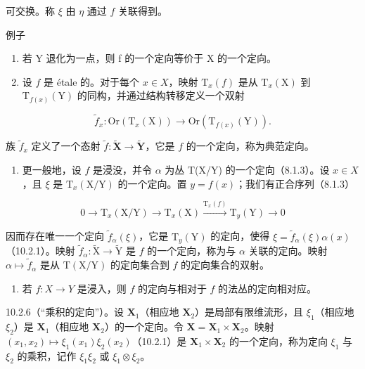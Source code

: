 可交换。称 \(\xi\) 由 \(\eta\) 通过 \(f\) 关联得到。

例子

\begin{enumerate}
\def\labelenumi{\alph{enumi})}
\item
  若 Y 退化为一点，则 f 的一个定向等价于 X 的一个定向。
\item
  设 \(f\) 是 étale 的。对于每个 \(x \in X\)，映射 \(\mathrm{T}_{x}(f)\) 是从 \(\mathrm{T}_{x}(\mathrm{X})\) 到 \(\mathrm{T}_{f(x)}(\mathrm{Y})\) 的同构，并通过结构转移定义一个双射
\end{enumerate}

\[
\tilde {f} _ {x}: \mathrm{Or} (\mathrm{T} _ {x} (\mathrm{X})) \rightarrow \mathrm{Or} (\mathrm{T} _ {f (x)} (\mathrm{Y})).
\]

族 \(\tilde{f}_{x}\) 定义了一个态射 \(\tilde{f}\colon\tilde{\mathbf{X}}\to\tilde{\mathbf{Y}}\)，它是 \(f\) 的一个定向，称为典范定向。

\begin{enumerate}
\def\labelenumi{\alph{enumi})}
\setcounter{enumi}{2}
\tightlist
\item
  更一般地，设 \(f\) 是浸没，并令 \(\alpha\) 为丛 T(X/Y) 的一个定向（8.1.3）。设 \(x\in X\)，且 \(\xi\) 是 \(\mathrm{T}_{x}(\mathrm{X}/\mathrm{Y})\) 的一个定向。置 \(y=f(x)\)；我们有正合序列（8.1.3）
\end{enumerate}

\[
0 \rightarrow \mathrm{T} _ {x} (\mathrm{X} / \mathrm{Y}) \rightarrow \mathrm{T} _ {x} (\mathrm{X}) \xrightarrow {\mathrm{T} _ {x} (f)} \mathrm{T} _ {y} (\mathrm{Y}) \rightarrow 0
\]

因而存在唯一一个定向 \(\tilde{f}_{\alpha}(\xi)\)，它是 \(\mathrm{T}_{y}(\mathrm{Y})\) 的定向，使得 \(\xi = \tilde{f}_{\alpha}(\xi)\alpha(x)\)（10.2.1）。映射 \(\tilde{f}_{\alpha}\colon \tilde{\mathrm{X}}\to \tilde{\mathrm{Y}}\) 是 \(f\) 的一个定向，称为与 \(\alpha\) 关联的定向。映射 \(\alpha \mapsto \tilde{f}_{\alpha}\) 是从 \(\mathrm{T}(\mathrm{X}/\mathrm{Y})\) 的定向集合到 \(f\) 的定向集合的双射。

\begin{enumerate}
\def\labelenumi{\alph{enumi})}
\setcounter{enumi}{3}
\tightlist
\item
  若 \(f: X \to Y\) 是浸入，则 \(f\) 的定向与相对于 \(f\) 的法丛的定向相对应。
\end{enumerate}

10.2.6（“乘积的定向”）。设 \(\mathbf{X}_1\)（相应地 \(\mathbf{X}_2\)）是局部有限维流形，且 \(\xi_1\)（相应地 \(\xi_2\)）是 \(\mathbf{X}_1\)（相应地 \(\mathbf{X}_2\)）的一个定向。令 \(\mathbf{X} = \mathbf{X}_1 \times \mathbf{X}_2\)。映射 \((x_1, x_2) \mapsto \xi_1(x_1)\xi_2(x_2)\)（10.2.1）是 \(\mathbf{X}_1 \times \mathbf{X}_2\) 的一个定向，称为定向 \(\xi_1\) 与 \(\xi_2\) 的乘积，记作 \(\xi_1\xi_2\) 或 \(\xi_1 \otimes \xi_2\)。

